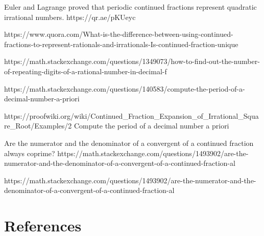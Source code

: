\documentclass[
  a4paper,
]{article}
\begin{document}
Euler and Lagrange proved that periodic continued fractions represent
quadratic irrational numbers. https://qr.ae/pKUeyc

https://www.quora.com/What-is-the-difference-between-using-continued-fractions-to-represent-rationals-and-irrationals-Is-continued-fraction-unique

https://math.stackexchange.com/questions/1349073/how-to-find-out-the-number-of-repeating-digits-of-a-rational-number-in-decimal-f

https://math.stackexchange.com/questions/140583/compute-the-period-of-a-decimal-number-a-priori

https://proofwiki.org/wiki/Continued\_Fraction\_Expansion\_of\_Irrational\_Square\_Root/Examples/2
Compute the period of a decimal number a priori

Are the numerator and the denominator of a convergent of a continued
fraction always coprime?
https://math.stackexchange.com/questions/1493902/are-the-numerator-and-the-denominator-of-a-convergent-of-a-continued-fraction-al

https://math.stackexchange.com/questions/1493902/are-the-numerator-and-the-denominator-of-a-convergent-of-a-continued-fraction-al

\hypertarget{bibliography}{%
\section*{References}\label{bibliography}}
\end{document}
